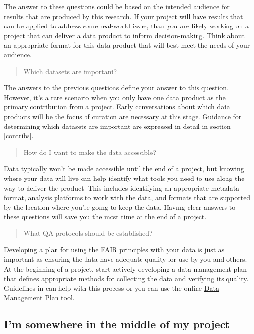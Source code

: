 \documentclass[
]{book}
\begin{document}
The answer to these questions could be based on the intended audience for results that are produced by this research. If your project will have results that can be applied to address some real-world issue, than you are likely working on a project that can deliver a data product to inform decision-making. Think about an appropriate format for this data product that will best meet the needs of your audience.

\begin{quote}
Which datasets are important?
\end{quote}

The answers to the previous questions define your answer to this question. However, it's a rare scenario when you only have one data product as the primary contribution from a project. Early conversations about which data products will be the focus of curation are necessary at this stage. Guidance for determining which datasets are important are expressed in detail in section \ref{contribs}.

\begin{quote}
How do I want to make the data accessible?
\end{quote}

Data typically won't be made accessible until the end of a project, but knowing where your data will live can help identify what tools you need to use along the way to deliver the product. This includes identifying an appropriate metadata format, analysis platforms to work with the data, and formats that are supported by the location where you're going to keep the data. Having clear answers to these questions will save you the most time at the end of a project.

\begin{quote}
What QA protocols should be established?
\end{quote}

Developing a plan for using the \hyperref[fair]{FAIR} principles with your data is just as important as ensuring the data have adequate quality for use by you and others. At the beginning of a project, start actively developing a data management plan that defines appropriate methods for collecting the data and verifying its quality. Guidelines in \citet{Michener15} can help with this process or you can use the online \href{https://dmptool.org/}{Data Management Plan tool}.

\subsection{I'm somewhere in the middle of my project}\label{middleproject}
\end{document}
